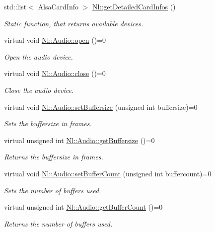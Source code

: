 \begin{DoxyCompactItemize}
\item 
std\-::list$<$ Alsa\-Card\-Info $>$ \hyperlink{group__Audio_ga26264a62d963bf999f7b4c3f17af5010}{Nl\-::get\-Detailed\-Card\-Infos} ()
\begin{DoxyCompactList}\small\item\em Static function, that returns available devices. \end{DoxyCompactList}\item 
virtual void \hyperlink{group__Audio_ga3da276862af02fe20717d07527eb2a3f}{Nl\-::\-Audio\-::open} ()=0
\begin{DoxyCompactList}\small\item\em Open the audio device. \end{DoxyCompactList}\item 
virtual void \hyperlink{group__Audio_gab8bf0d58ba2f88514c7d6b1756678175}{Nl\-::\-Audio\-::close} ()=0
\begin{DoxyCompactList}\small\item\em Close the audio device. \end{DoxyCompactList}\item 
virtual void \hyperlink{group__Audio_gad8e03febba94313406f192d7d70eb109}{Nl\-::\-Audio\-::set\-Buffersize} (unsigned int buffersize)=0
\begin{DoxyCompactList}\small\item\em Sets the buffersize in frames. \end{DoxyCompactList}\item 
virtual unsigned int \hyperlink{group__Audio_ga2e3c5209b59e9abe5dd7d04dfef301cb}{Nl\-::\-Audio\-::get\-Buffersize} ()=0
\begin{DoxyCompactList}\small\item\em Returns the buffersize in frames. \end{DoxyCompactList}\item 
virtual void \hyperlink{group__Audio_ga9cca4b557c979fb6bb8c5a7b8978904d}{Nl\-::\-Audio\-::set\-Buffer\-Count} (unsigned int buffercount)=0
\begin{DoxyCompactList}\small\item\em Sets the number of buffers used. \end{DoxyCompactList}\item 
virtual unsigned int \hyperlink{group__Audio_gaf133dbf0605d95370f745d6d0e7373dc}{Nl\-::\-Audio\-::get\-Buffer\-Count} ()=0
\begin{DoxyCompactList}\small\item\em Returns the number of buffers used. \end{DoxyCompactList}\item 

\end{DoxyCompactItemize}
